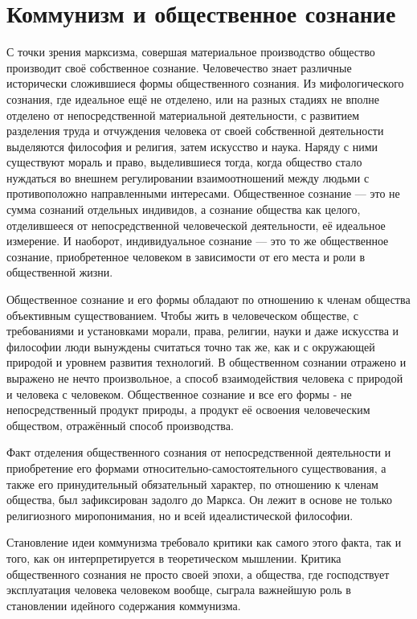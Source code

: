 \documentclass[12pt,a4paper,openany]{book}
\begin{document}
\section{Коммунизм и общественное сознание}
\label{sec:10_kommunizm_soznanie}

С точки зрения марксизма, совершая материальное производство общество производит своё собственное сознание. Человечество знает различные исторически сложившиеся формы общественного сознания. Из мифологического сознания, где идеальное ещё не отделено, или на разных стадиях не вполне отделено от непосредственной материальной деятельности, с развитием разделения труда и отчуждения человека от своей собственной деятельности выделяются философия и религия, затем искусство и наука. Наряду с ними существуют мораль и право, выделившиеся тогда, когда общество стало нуждаться во внешнем регулировании взаимоотношений между людьми с противоположно направленными интересами. Общественное сознание — это не сумма сознаний отдельных индивидов, а сознание общества как целого, отделившееся от непосредственной человеческой деятельности, её идеальное измерение. И наоборот, индивидуальное сознание — это то же общественное сознание, приобретенное человеком в зависимости от его места и роли в общественной жизни.

Общественное сознание и его формы обладают по отношению к членам общества объективным существованием. Чтобы жить в человеческом обществе, с требованиями и установками морали, права, религии, науки и даже искусства и философии люди вынуждены считаться точно так же, как и с окружающей природой и уровнем развития технологий. В общественном сознании отражено и выражено не нечто произвольное, а способ взаимодействия человека с природой и человека с человеком. Общественное сознание и все его формы - не непосредственный продукт природы, а продукт её освоения человеческим обществом, отражённый способ производства.

Факт отделения общественного сознания от непосредственной деятельности и приобретение его формами относительно-самостоятельного существования, а также его принудительный обязательный характер, по отношению к членам общества, был зафиксирован задолго до Маркса. Он лежит в основе не только религиозного миропонимания, но и всей идеалистической философии.

Становление идеи коммунизма требовало критики как самого этого факта, так и того, как он интерпретируется в теоретическом мышлении. Критика общественного сознания не просто своей эпохи, а общества, где господствует эксплуатация человека человеком вообще, сыграла важнейшую роль в становлении идейного содержания коммунизма.
\end{document}
